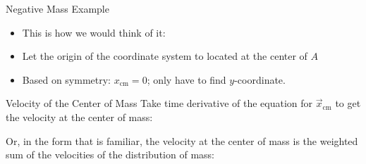 \documentclass[12pt,compress,aspectratio=169]{beamer}
\begin{document}
\begin{frame}{Negative Mass Example}
  \begin{itemize}
  \item This is how we would think of it:
    \begin{center}
    \end{center}
  \item Let the origin of the coordinate system to located at the center of $A$
  \item Based on symmetry: $x_\text{cm}=0$; only have to find $y$-coordinate.
  \end{itemize}

\end{frame}




%    

%
%
%    



\begin{frame}{Velocity of the Center of Mass}
  Take time derivative of the equation for $\vec x_\text{cm}$ to get the
  velocity at the center of mass:


  Or, in the form that is familiar, the velocity at the center of mass is the
  weighted sum of the velocities of the distribution of mass:
  
\end{frame}
\end{document}
